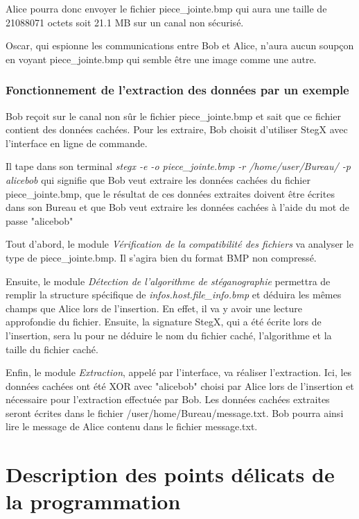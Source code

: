 \documentclass[11pt]{article}
\begin{document}
Alice pourra donc envoyer le fichier piece\_jointe.bmp qui aura une taille 
de 21088071 octets soit 21.1 MB sur un canal non sécurisé. 

Oscar, qui espionne les communications entre Bob et Alice, n'aura aucun 
soupçon en voyant piece\_jointe.bmp qui semble être une image comme une 
autre. 

\subsubsection{Fonctionnement de l'extraction des données par un exemple}

Bob reçoit sur le canal non sûr le fichier piece\_jointe.bmp et sait que 
ce fichier contient des données cachées. Pour les extraire, Bob choisit 
d'utiliser StegX avec l'interface en ligne de commande. 

Il tape dans son terminal \textit{stegx -e -o piece\_jointe.bmp -r 
/home/user/Bureau/ -p alicebob} qui signifie que Bob veut extraire les 
données cachées du fichier piece\_jointe.bmp, que le résultat de ces 
données extraites doivent être écrites dans son Bureau et que Bob veut 
extraire les données cachées à l'aide du mot de passe "alicebob"

Tout d'abord, le module \textit{Vérification de la compatibilité des 
fichiers} va analyser le type de piece\_jointe.bmp. Il s'agira bien du 
format BMP non compressé. 

Ensuite, le module \textit{Détection de l'algorithme de stéganographie}
permettra de remplir la structure spécifique de \textit{infos.host.file\_info.bmp}
et déduira les mêmes champs que Alice lors de l'insertion. En effet, 
il va y avoir une lecture approfondie du fichier. Ensuite, la signature 
StegX, qui a été écrite lors de l'insertion, sera lu pour ne déduire 
le nom du fichier caché, l'algorithme et la taille du fichier caché. 

Enfin, le module \textit{Extraction}, appelé par l'interface, va réaliser 
l'extraction. Ici, les données cachées ont été XOR avec "alicebob" choisi 
par Alice lors de l'insertion et nécessaire pour l'extraction effectuée 
par Bob. 
Les données cachées extraites seront écrites dans le fichier
/user/home/Bureau/message.txt. Bob pourra ainsi lire le message de Alice 
contenu dans le fichier message.txt. 

\section{Description des points délicats de la programmation}
\end{document}
